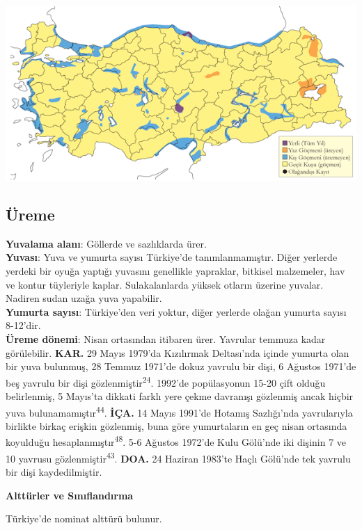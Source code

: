 \documentclass[
  letterpaper,
  DIV=11,
  numbers=noendperiod]{scrreprt}
\begin{document}
\includegraphics{images/harita_Page_020.png}

\hypertarget{uxfcreme-19}{%
\subsection{\texorpdfstring{\textbf{Üreme}}{Üreme}}\label{uxfcreme-19}}

\textbf{Yuvalama alanı}: Göllerde ve sazlıklarda ürer.\\
\textbf{Yuvası}: Yuva ve yumurta sayısı Türkiye'de tanımlanmamıştır.
Diğer yerlerde yerdeki bir oyuğa yaptığı yuvasını genellikle yapraklar,
bitkisel malzemeler, hav ve kontur tüyleriyle kaplar. Sulakalanlarda
yüksek otların üzerine yuvalar. Nadiren sudan uzağa yuva yapabilir.\\
\textbf{Yumurta sayısı}: Türkiye'den veri yoktur, diğer yerlerde olağan
yumurta sayısı 8-12'dir.\\
\textbf{Üreme dönemi}: Nisan ortasından itibaren ürer. Yavrular temmuza
kadar görülebilir. \textbf{KAR.} 29 Mayıs 1979'da Kızılırmak Deltası'nda
içinde yumurta olan bir yuva bulunmuş, 28 Temmuz 1971'de dokuz yavrulu
bir dişi, 6 Ağustos 1971'de beş yavrulu bir dişi
gözlenmiştir\textsuperscript{24}. 1992'de popülasyonun 15-20 çift olduğu
belirlenmiş, 5 Mayıs'ta dikkati farklı yere çekme davranışı gözlenmiş
ancak hiçbir yuva bulunamamıştır\textsuperscript{44}. \textbf{İÇA.} 14
Mayıs 1991'de Hotamış Sazlığı'nda yavrularıyla birlikte birkaç erişkin
gözlenmiş, buna göre yumurtaların en geç nisan ortasında koyulduğu
hesaplanmıştır\textsuperscript{48}. 5-6 Ağustos 1972'de Kulu Gölü'nde
iki dişinin 7 ve 10 yavrusu gözlenmiştir\textsuperscript{43}.
\textbf{DOA.} 24 Haziran 1983'te Haçlı Gölü'nde tek yavrulu bir dişi
kaydedilmiştir.

\textbf{Alttürler ve Sınıflandırma}

Türkiye'de nominat alttürü bulunur.
\end{document}
